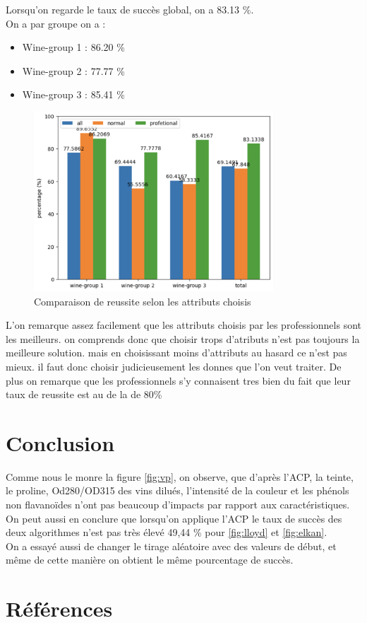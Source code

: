 \documentclass[a4paper,12pt]{article}
\begin{document}
Lorsqu'on regarde le taux de succès global, on a 83.13 \%.\\

On a par groupe on a :
\begin{itemize}
\item Wine-group 1 : 86.20 \%
\item Wine-group 2 : 77.77 \%
\item Wine-group 3 : 85.41 \%
\end{itemize}
\newpage
\begin{figure}[h!] %
   \centering
   \includegraphics[width=0.8\textwidth]{differents_attributes.png} %
   \caption{Comparaison de reussite selon les attributs choisis}
\end{figure}

L'on remarque assez facilement que les attributs choisis par les professionnels sont les meilleurs.
on comprends donc que choisir trops d'atributs n'est pas toujours la meilleure solution. mais en choisissant
 moins d'attributs au hasard ce n'est pas mieux. il faut donc choisir judicieusement les donnes que l'on veut traiter.
  De plus on remarque que les professionnels s'y connaisent tres bien du fait que leur taux de reussite est au de la de 80\%
\newpage

\section{Conclusion}
\label{sec:conclusion}

Comme nous le monre la figure \ref{fig:vp}, on observe, que d'après l'ACP,  la teinte, le proline, Od280/OD315 des vins dilués, l'intensité de la couleur et les phénols non flavanoïdes n'ont pas beaucoup d'impacts par rapport aux caractéristiques.\\

On peut aussi en conclure que lorsqu'on applique l'ACP le taux de succès des deux algorithmes n'est pas très élevé 49,44 \% pour \ref{fig:lloyd} et \ref{fig:elkan}.\\

On a essayé aussi de changer le tirage aléatoire avec des valeurs de début, et même de cette manière on obtient le même pourcentage de succès.

\section*{Références}
\label{sec:référence}
\end{document}
